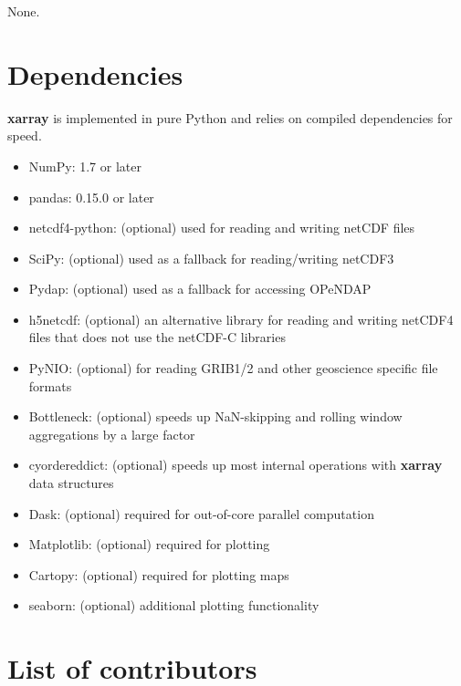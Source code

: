 \documentclass{jors}
\begin{document}
None.

\section*{Dependencies}

\textbf{xarray} is implemented in pure Python and relies on compiled dependencies for
speed.

\begin{itemize}
\item NumPy: 1.7 or later
\item pandas: 0.15.0 or later
\item netcdf4-python: (optional) used for reading and writing netCDF files
\item SciPy: (optional) used as a fallback for reading/writing netCDF3
\item Pydap: (optional) used as a fallback for accessing OPeNDAP
\item h5netcdf: (optional) an alternative library for reading and writing netCDF4 files that does not use the netCDF-C libraries
\item PyNIO: (optional) for reading GRIB1/2 and other geoscience specific file formats
\item Bottleneck: (optional) speeds up NaN-skipping and rolling window aggregations by a large factor
\item cyordereddict: (optional) speeds up most internal operations with \textbf{xarray} data structures
\item Dask: (optional) required for out-of-core parallel computation
\item Matplotlib: (optional) required for plotting
\item Cartopy: (optional) required for plotting maps
\item seaborn: (optional) additional plotting functionality
\end{itemize}

\section*{List of contributors}
\end{document}
